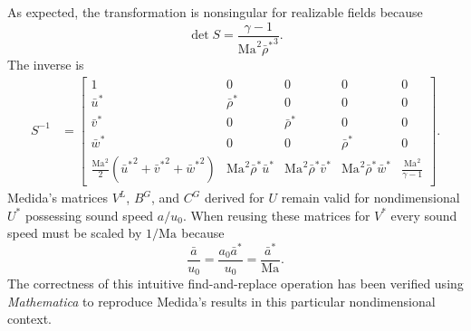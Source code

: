 \documentclass[letterpaper,11pt,nointlimits,reqno,draft]{amsbook}
\newcommand{\Mach}[1][]{\ensuremath{\mbox{Ma}_{#1}}}
\begin{document}
As expected, the transformation is nonsingular for realizable fields because
\[
  \det S = \frac{\gamma-1}{\Mach^2 {\bar{\rho}^{*}}^3}.
\]
The inverse is
\begin{align}
S^{-1} &= \left[\begin{array}{ccccc}
  1                                                                       & 0                              & 0                              & 0                              & 0                        \\
  \bar{u}^{*}                                                             & \bar{\rho}^*                   & 0                              & 0                              & 0                        \\
  \bar{v}^{*}                                                             & 0                              & \bar{\rho}^*                   & 0                              & 0                        \\
  \bar{w}^{*}                                                             & 0                              & 0                              & \bar{\rho}^*                   & 0                        \\
  \frac{\Mach^2}{2}\left({\bar{u}^*}^2+{\bar{v}^*}^2+{\bar{w}^*}^2\right) & \Mach^2 \bar{\rho}^* \bar{u}^* & \Mach^2 \bar{\rho}^* \bar{v}^* & \Mach^2 \bar{\rho}^* \bar{w}^* & \frac{\Mach^2}{\gamma-1}
\end{array}\right]
.
\end{align}
Medida's matrices $V^L$, $B^G$, and $C^G$ derived for $U$ remain valid for
nondimensional $U^*$ possessing sound speed $a/u_0$.  When reusing these
matrices for $V^*$ every sound speed must be scaled by $1/\Mach$ because
\[
  \frac{\bar{a}}{u_0} = \frac{a_0 \bar{a}^*}{u_0} = \frac{\bar{a}^*}{\Mach}.
\]
The correctness of this intuitive find-and-replace operation has been verified
using \emph{Mathematica} to reproduce Medida's results in this particular
nondimensional context.
\end{document}
